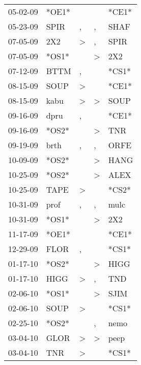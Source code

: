 \begin{supertabular}{lllll}
 05-02-09 &  *OE1* &                  &                  &  *CE1* \\
 05-23-09 &   SPIR &                , &                , &   SHAF \\
 07-05-09 &    2X2 &     \textgreater &                , &   SPIR \\
 07-05-09 &  *OS1* &                  &     \textgreater &    2X2 \\
 07-12-09 &   BTTM &                , &                  &  *CS1* \\
 08-15-09 &   SOUP &     \textgreater &                  &  *CE1* \\
 08-15-09 &   kabu &     \textgreater &     \textgreater &   SOUP \\
 09-16-09 &   dpru &                , &                  &  *CE1* \\
 09-16-09 &  *OS2* &                  &     \textgreater &    TNR \\
 09-19-09 &   brth &                , &                , &   ORFE \\
 10-09-09 &  *OS2* &                  &     \textgreater &   HANG \\
 10-25-09 &  *OS2* &                  &     \textgreater &   ALEX \\
 10-25-09 &   TAPE &     \textgreater &                  &  *CS2* \\
 10-31-09 &   prof &                , &                , &   mulc \\
 10-31-09 &  *OS1* &                  &     \textgreater &    2X2 \\
 11-17-09 &  *OE1* &                  &                  &  *CE1* \\
 12-29-09 &   FLOR &                , &                  &  *CS1* \\
 01-17-10 &  *OS2* &                  &     \textgreater &   HIGG \\
 01-17-10 &   HIGG &     \textgreater &                , &    TND \\
 02-06-10 &  *OS1* &                  &     \textgreater &   SJIM \\
 02-06-10 &   SOUP &     \textgreater &                  &  *CS1* \\
 02-25-10 &  *OS2* &                  &                , &   nemo \\
 03-04-10 &   GLOR &     \textgreater &     \textgreater &   peep \\
 03-04-10 &    TNR &     \textgreater &                  &  *CS1* \\

\end{supertabular}
